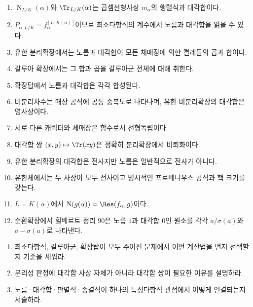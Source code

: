 \begin{chapterreview}
\begin{enumerate}[label=\arabic*.]
  \item $\operatorname N_{L/K}(\alpha)$와 $\Tr_{L/K}(\alpha)$는 곱셈선형사상 $m_\alpha$의 행렬식과 대각합이다.
  \item $P_{\alpha,L/K}=f_\alpha^{[L:K(\alpha)]}$이므로 최소다항식의 계수에서 노름과 대각합을 읽을 수 있다.
  \item 유한 분리확장에서는 노름과 대각합이 모든 체매장에 의한 켤레들의 곱과 합이다.
  \item 갈루아 확장에서는 그 합과 곱을 갈루아군 전체에 대해 취한다.
  \item 확장탑에서 노름과 대각합은 각각 합성된다.
  \item 비분리차수는 매장 공식에 공통 중복도로 나타나며, 유한 비분리확장의 대각합은 영사상이다.
  \item 서로 다른 캐릭터와 체매장은 함수로서 선형독립이다.
  \item 대각합 쌍 $(x,y)\mapsto\Tr(xy)$은 정확히 분리확장에서 비퇴화이다.
  \item 유한 분리확장의 대각합은 전사지만 노름은 일반적으로 전사가 아니다.
  \item 유한체에서는 두 사상이 모두 전사이고 명시적인 프로베니우스 공식과 핵 크기를 갖는다.
  \item $L=K(\alpha)$에서 $\operatorname N(g(\alpha))=\Res(f_\alpha,g)$이다.
  \item 순환확장에서 힐베르트 정리 90은 노름 $1$과 대각합 $0$인 원소를 각각 $a/\sigma(a)$와 $a-\sigma(a)$로 나타낸다.
\end{enumerate}
\end{chapterreview}

\begin{checkpoint}
\begin{enumerate}[label=(\alph*)]
  \item 최소다항식, 갈루아군, 확장탑이 모두 주어진 문제에서 어떤 계산법을 먼저 선택할지 기준을 세워라.
  \item 분리성 판정에 대각합 사상 자체가 아니라 대각합 쌍이 필요한 이유를 설명하라.
  \item 노름·대각합·판별식·종결식이 하나의 특성다항식 관점에서 어떻게 연결되는지 서술하라.
\end{enumerate}
\end{checkpoint}
